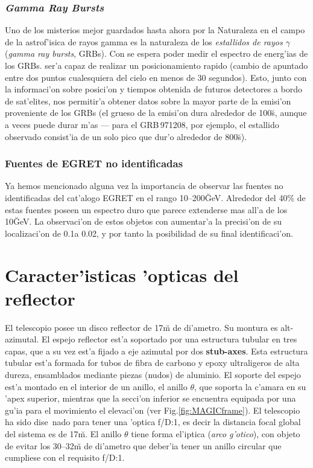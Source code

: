 \subsubsection*{\emph{Gamma Ray Bursts}} 
%
Uno de los misterios mejor guardados hasta ahora por la Naturaleza en
el campo de la astrof'isica de rayos gamma es la naturaleza de los 
\emph{estallidos de rayos $\gamma$} (\emph{gamma ray bursts},
GRBs). Con \MAGIC se espera poder medir el espectro de energ'ias de
los GRBs. \MAGIC ser'a capaz de realizar un posicionamiento rapido
(cambio de apuntado entre dos puntos cualesquiera del cielo en menos
de 30 segundos). Esto, junto con la informaci'on sobre posici'on y
tiempos obtenida de futuros detectores a bordo de sat'elites, nos
permitir'a obtener datos sobre la mayor parte de la emisi'on
proveniente de los GRBs (el grueso de la emisi'on dura alrededor de
100\u{s}, aunque a veces puede durar m'as --- para el GRB\,971208, por
ejemplo, el estallido observado consist'ia de un solo pico que dur'o
alrededor de 800\u{s}).

\subsubsection*{Fuentes de EGRET no identificadas} 
%
Ya hemos mencionado alguna vez la importancia de observar las fuentes
no identificadas del cat'alogo EGRET en el rango
10--200\u{GeV}. Alrededor del 40\% de estas fuentes poseen un espectro 
duro que parece extenderse mas all'a de los 10\u{GeV}. La observaci'on 
de estos objetos con \MAGIC aumentar'a la precisi'on de su
localizaci'on de 0.1\deg a 0.02\deg, y por tanto la posibilidad de su
final identificaci'on.

\MAGICframefig

\section{Caracter'isticas 'opticas del reflector}
%
El telescopio \MAGIC posee un disco reflector de 17\u{m} de
di'ametro. Su montura es alt-azimutal. El espejo reflector est'a
soportado por una estructura tubular en tres capas, que a su vez est'a
fijado a eje azimutal por dos {\bf stub-axes}. Esta estructura tubular
est'a formada for tubos de fibra de carbono y epoxy ultraligeros de
alta dureza, ensamblados mediante piezas (nudos) de aluminio. El
soporte del espejo est'a montado en el interior de un anillo, el
anillo $\theta$, que soporta la c'amara en su 'apex superior, mientras
que la secci'on inferior se encuentra equipada por una gu'ia para el
movimiento el elevaci'on (ver Fig.\ref{fig:MAGICframe}). El telescopio
ha sido dise~nado para tener una 'optica f/D:1, es decir la distancia
focal global del sistema es de 17\u{m}. El anillo $\theta$ tiene forma
el'iptica (\emph{arco g'otico}), con objeto de evitar los 30--32\u{m}
de di'ametro que deber'ia tener un anillo circular que cumpliese con
el requisito f/D:1.

